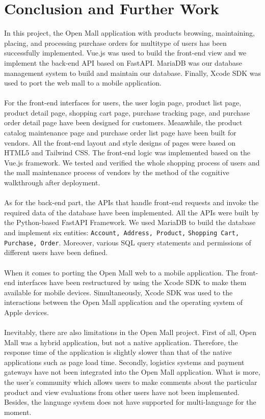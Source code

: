 \documentclass{article}
\begin{document}
\section{Conclusion and Further Work}
In this project, the Open Mall application with products browsing, maintaining,  placing, and processing purchase orders for multitype of users has been successfully implemented. Vue.js was used to build the front-end view and we implement the back-end API based on FastAPI. MariaDB was our database management system to build and maintain our database. Finally, Xcode SDK was used to port the web mall to a mobile application.
\\\\
For the front-end interfaces for users, the user login page,  product list page, product detail page, shopping cart page, purchase tracking page, and purchase order detail page have been designed for customers. Meanwhile, the product catalog maintenance page and purchase order list page have been built for vendors. All the front-end layout and style designs of pages were based on HTML5 and Tailwind CSS. The front-end logic was implemented based on the Vue.js framework. We tested and verified the whole shopping process of users and the mall maintenance process of vendors by the method of the cognitive walkthrough after deployment.
\\\\
As for the back-end part, the APIs that handle front-end requests and invoke the required data of the database have been implemented. All the APIs were built by the Python-based FastAPI Framework. We used MariaDB to build the database and implement six entities: \verb|Account, Address, Product,| \verb|Shopping Cart, Purchase, Order|. Moreover, various SQL query statements and permissions of different users have been defined.
\\\\
When it comes to porting the Open Mall web to a mobile application. The front-end interfaces have been restructured by using the Xcode SDK to make them available for mobile devices. Simultaneously, Xcode SDK was used to the interactions between the Open Mall application and the operating system of Apple devices. 
\\\\
Inevitably, there are also limitations in the Open Mall project. First of all, Open Mall was a hybrid application, but not a native application. Therefore, the response time of the application is slightly slower than that of the native applications such as page load time. Secondly, logistics systems and payment gateways have not been integrated into the Open Mall application. What is more, the user’s community which allows users to make comments about the particular product and view evaluations from other users have not been implemented. Besides, the language system does not have supported for multi-language for the moment. 
\end{document}
